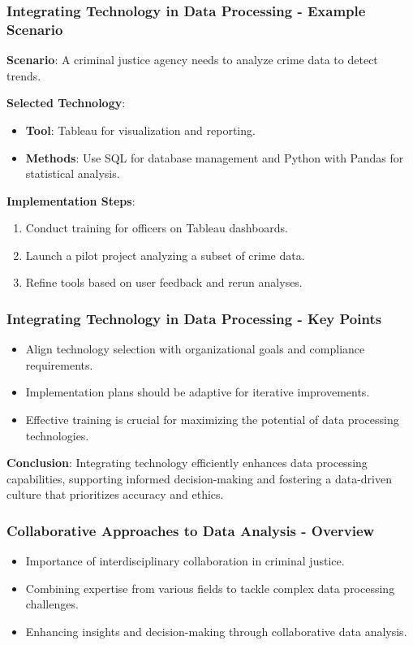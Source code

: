 \documentclass[aspectratio=169]{beamer}
\begin{document}
\begin{frame}[fragile]
    \frametitle{Integrating Technology in Data Processing - Example Scenario}
    \textbf{Scenario}: A criminal justice agency needs to analyze crime data to detect trends.
    
    \textbf{Selected Technology}:
    \begin{itemize}
        \item \textbf{Tool}: Tableau for visualization and reporting.
        \item \textbf{Methods}: Use SQL for database management and Python with Pandas for statistical analysis.
    \end{itemize}
    
    \textbf{Implementation Steps}:
    \begin{enumerate}
        \item Conduct training for officers on Tableau dashboards.
        \item Launch a pilot project analyzing a subset of crime data.
        \item Refine tools based on user feedback and rerun analyses.
    \end{enumerate}
\end{frame}

\begin{frame}[fragile]
    \frametitle{Integrating Technology in Data Processing - Key Points}
    \begin{itemize}
        \item Align technology selection with organizational goals and compliance requirements.
        \item Implementation plans should be adaptive for iterative improvements.
        \item Effective training is crucial for maximizing the potential of data processing technologies.
    \end{itemize}
    
    \textbf{Conclusion}: Integrating technology efficiently enhances data processing capabilities, supporting informed decision-making and fostering a data-driven culture that prioritizes accuracy and ethics.
\end{frame}

\begin{frame}[fragile]
    \frametitle{Collaborative Approaches to Data Analysis - Overview}
    \begin{itemize}
        \item Importance of interdisciplinary collaboration in criminal justice.
        \item Combining expertise from various fields to tackle complex data processing challenges.
        \item Enhancing insights and decision-making through collaborative data analysis.
    \end{itemize}
\end{frame}
\end{document}
